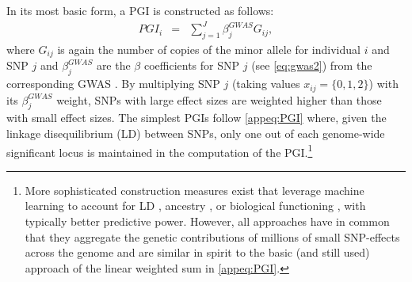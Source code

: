 \documentclass[12pt,a4paper]{article}
\begin{document}
\begin{bibunit}
In its most basic form, a PGI is constructed as follows: 
\begin{eqnarray}
PGI_i & = & \sum_{j=1}^{J} \beta_j^{GWAS} G_{ij},
\label{appeq:PGI}
\end{eqnarray}
where $G_{ij}$ is again the number of copies of the minor allele for individual $i$ and SNP $j$ and {\small $\beta_j^{GWAS}$} are the $\beta$ coefficients for SNP $j$ (see \autoref{eq:gwas2}) from the corresponding GWAS  \citep{dudbridge2013power}. By multiplying SNP $j$ (taking values $x_{ij} = \{0,1,2\}$) with its {\small $\beta_j^{GWAS}$} weight, SNPs with large effect sizes are weighted higher than those with small effect sizes. The simplest PGIs follow \autoref{appeq:PGI} where, given the linkage disequilibrium (LD) between SNPs, only one out of each genome-wide significant locus is maintained in the computation of the PGI.\footnote{More sophisticated construction measures exist that  leverage machine learning to account for LD \citep[see, for example,][]{so2017improving,Vilhjalmsson2015}, ancestry \citep{Marnetto2020}, or biological functioning \citep{liu2020leveraging,choi2023prset}, with typically better predictive power. However, all approaches have in common that they aggregate the genetic contributions of millions of small SNP-effects across the genome and are similar in spirit to the basic (and still used) approach of the linear weighted sum in \autoref{appeq:PGI}.}


\end{bibunit}
\end{document}
